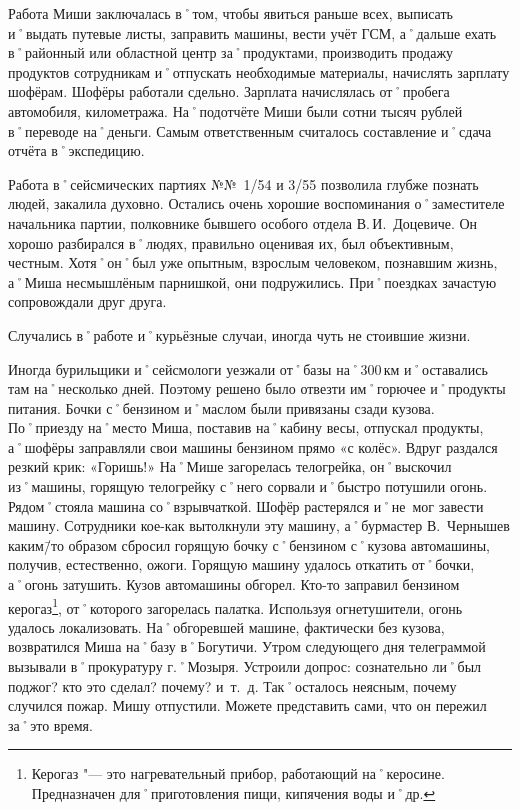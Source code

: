 Работа Миши заключалась в˚том, чтобы явиться раньше всех, выписать и˚выдать путевые листы, заправить машины, вести учёт ГСМ, а˚дальше ехать в˚районный или областной центр за˚продуктами, производить продажу продуктов сотрудникам и˚отпускать необходимые материалы, начислять зарплату шофёрам. Шофёры работали сдельно. Зарплата начислялась от˚пробега автомобиля, километража. На˚подотчёте Миши были сотни тысяч рублей в˚переводе на˚деньги. Самым ответственным считалось составление и˚сдача отчёта в˚экспедицию.

Работа в˚сейсмических партиях №№~1/54 и 3/55 позволила глубже познать людей, закалила духовно. Остались очень хорошие воспоминания о˚заместителе начальника партии, полковнике бывшего особого отдела В.\,И.~Доцевиче. Он хорошо разбирался в˚людях, правильно оценивая их, был объективным, честным. Хотя˚он˚был уже опытным, взрослым человеком, познавшим жизнь, а˚Миша несмышлёным парнишкой, они подружились. При˚поездках зачастую сопровождали друг друга.

Случались в˚работе и˚курьёзные случаи, иногда чуть не стоившие жизни.

Иногда бурильщики и˚сейсмологи уезжали от˚базы на˚300\,км и˚оставались там на˚несколько дней. Поэтому решено было отвезти им˚горючее и˚продукты питания. Бочки с˚бензином и˚маслом были привязаны сзади кузова. По˚приезду на˚место Миша, поставив на˚кабину весы, отпускал продукты, а˚шофёры заправляли свои машины бензином прямо «с колёс». Вдруг раздался резкий крик: «Горишь!» На˚Мише загорелась телогрейка, он˚выскочил из˚машины, горящую телогрейку с˚него сорвали и˚быстро потушили огонь. Рядом˚стояла машина со˚взрывчаткой. Шофёр растерялся и˚не~мог завести машину. Сотрудники кое-как вытолкнули эту машину, а˚бурмастер В.~Чернышев каким\=/то образом сбросил горящую бочку с˚бензином с˚кузова автомашины, получив, естественно, ожоги. Горящую машину удалось откатить от˚бочки, а˚огонь затушить. Кузов автомашины обгорел. Кто-то заправил бензином керогаз\footnote{Керогаз "--- это нагревательный прибор, работающий на˚керосине. Предназначен для˚приготовления пищи, кипячения воды и˚др.}, от˚которого загорелась палатка. Используя огнетушители, огонь удалось локализовать. На˚обгоревшей машине, фактически без кузова, возвратился Миша на˚базу в˚Богутичи. Утром следующего дня телеграммой вызывали в˚прокуратуру г.˚Мозыря. Устроили допрос: сознательно ли˚был поджог? кто это сделал? почему? и~т.~д. Так˚осталось неясным, почему случился пожар. Мишу отпустили. Можете представить сами, что он пережил за˚это время.

